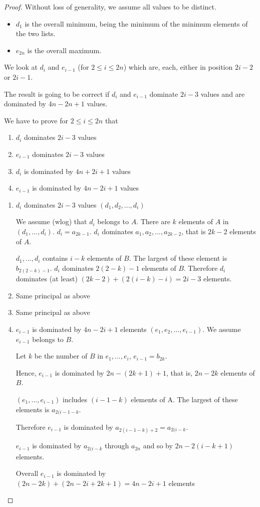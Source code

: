 \begin{proof}
Without loss of generality, we assume all values to be distinct.
\begin{itemize}
\item $d_1$ is the overall minimum, being the minimum of the minimum elements of the two lists.
\item $e_{2n}$ is the overall maximum.
\end{itemize}
 We look at $d_i$ and $e_{i-1}$ (for $2\leq i\leq 2n$) which are, each, either in position $2i-2$ or $2i-1$.

The result is going to be correct if $d_i$ and $e_{i-1}$ dominate $2i-3$ values and are dominated by $4n-2n+1$ values.

We have to prove for $2\leq i \leq 2n$ that 
\begin{enumerate}
\item $d_i$ dominates $2i-3$ values
\item $e_{i-1}$ dominates $2i-3$ values
\item $d_i$ is dominated by $4n+ 2i + 1$ values
\item $e_{i-1}$ is dominated by $4n - 2i + 1$ values
\end{enumerate}

\begin{enumerate}
\item $d_i$ dominates $2i-3$ values $(d_1,d_2,...,d_i)$

We assume (wlog) that $d_i$ belongs to $A$. There are $k$ elements of $A$ in $(d_1,...,d_i)$. $d_i=a_{2k-1}$. $d_i$ dominates $a_1, a_2,...,a_{2k-2}$, that is $2k-2$ elements of $A$.

$d_1,...,d_i$ contains $i-k$ elements of $B$. The largest of these element is $b_{2(2-k)-1}$. $d_i$ dominates $2(2-k)-1$ elements of $B$. Therefore $d_i$ dominates (at least) $(2k-2) + (2 (i-k)-i) = 2i - 3$ elements.
\item Same principal as above
\item Same principal as above
\item $e_{i-1}$ is dominated by $4n - 2i + 1$ elements $(e_1,e_2,...,e_{i-1})$. We assume $e_{i-1}$ belongs to $B$.

Let $k$ be the number of $B$ in $e_1,...,e_i$, $e_{i-1}=b_{2k}$.

Hence, $e_{i-1}$ is dominated by $2n-(2k+1)+1$, that is, $2n-2k$ elements of $B$.

$(e_1,...,e_{i-1})$ includes $(i-1-k)$ elements of A. The largest of these elements is $a_{2(i-1-k}$.

Therefore $e_{i-1}$ is dominated by $a_{2(i-1-k)+2}=a_{2(i-k}$. 

$e_{i-1}$ is dominated by $a_{2(i-k}$ through $a_{2n}$ and so by $2n-2(i-k+1)$ elements.

Overall $e_{i-1}$ is dominated by $(2n-2k)+(2n-2i+2k+1)=4n-2i+1$ elements
\end{enumerate}
\end{proof}


